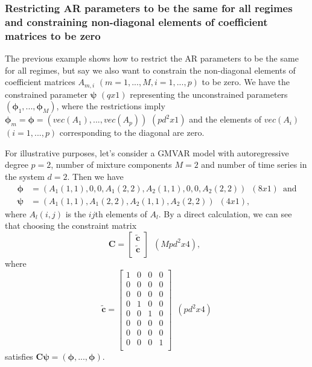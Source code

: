 \documentclass[nojss]{jss}
\begin{document}
\subsubsection{Restricting AR parameters to be the same for all regimes and constraining non-diagonal elements of coefficient matrices to be zero}
The previous example shows how to restrict the AR parameters to be the same for all regimes, but say we also want to constrain the non-diagonal elements of coefficient matrices $A_{m,i}$ $(m=1,...,M, i=1,...,p)$ to be zero. We have the constrained parameter $\boldsymbol{\psi}$ $(qx1)$ representing the unconstrained parameters $(\boldsymbol{\phi}_1,...,\boldsymbol{\phi}_M)$, where the restrictions imply $\boldsymbol{\phi}_m=\boldsymbol{\phi}=(vec(A_1),...,vec(A_p))$ $(pd^2x1)$ and the elements of $vec(A_i)$ $(i=1,...,p)$ corresponding to the diagonal are zero.

For illustrative purposes, let's consider a GMVAR model with autoregressive degree $p=2$, number of mixture components $M=2$ and number of time series in the system $d=2$. Then we have
\begin{align}
\boldsymbol{\phi}&=(A_1(1,1),0,0,A_1(2,2),A_2(1,1),0,0,A_2(2,2)) \enspace (8x1) \enspace \text{and}\\
\boldsymbol{\psi}&=(A_1(1,1),A_1(2,2),A_2(1,1),A_2(2,2)) \enspace (4x1),
\end{align}
where $A_l(i,j)$ is the $ij$th elements of $A_l$. By a direct calculation, we can see that choosing the constraint matrix
\begin{equation}
\boldsymbol{C}=\left[{\begin{array}{c}
   \boldsymbol{\tilde{c}} \\
   \boldsymbol{\tilde{c}} \\
  \end{array}}\right]
\enspace (Mpd^2x4),
\enspace
\end{equation}
where
\begin{equation}
\boldsymbol{\tilde{c}}=\left[{\begin{array}{cccc}
   1 & 0 & 0 & 0 \\
   0 & 0 & 0 & 0 \\
   0 & 0 & 0 & 0 \\
   0 & 1 & 0 & 0 \\
   0 & 0 & 1 & 0 \\
   0 & 0 & 0 & 0 \\
   0 & 0 & 0 & 0 \\
   0 & 0 & 0 & 1 \\
  \end{array}}\right]
\enspace (pd^2x4)
\end{equation}
satisfies $\boldsymbol{C}\boldsymbol{\psi}=(\boldsymbol{\phi},...,\boldsymbol{\phi}).$
\end{document}

